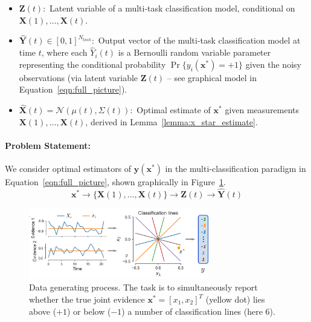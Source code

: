 \documentclass[12pt]{article}
\begin{document}
\begin{itemize}
    \item $\mathbf Z(t): $ Latent variable of a multi-task classification model, conditional on $\mathbf X(1), \dots, \mathbf X(t)$. 
    \item $\hat{\mathbf Y}(t) \in [0, 1]^{N_{task}}: $ Output vector of the multi-task classification model at time $t$, where each $\hat Y_i(t)$ is a Bernoulli random variable parameter representing the conditional probability $\Pr\{y_i(\mathbf x^*) = +1\}$ given the noisy observations (via latent variable $\mathbf Z(t)$ -- see graphical model in Equation~\ref{eqn:full_picture}). 
    \item $\hat{\mathbf X}(t) = \mathcal N(\mu(t), \Sigma(t)): $ Optimal estimate of $\mathbf x^*$ given measurements $\mathbf X(1), \dots, \mathbf X(t)$, derived in Lemma~\ref{lemma:x_star_estimate}. 
\end{itemize}

\paragraph{Problem Statement: } We consider optimal estimators of $\mathbf y(\mathbf x^*)$ in the multi-classification paradigm in Equation~\ref{eqn:full_picture}, shown graphically in Figure~\ref{fig:2a}. 
\begin{equation}
    \label{eqn:full_picture}
    \mathbf x^* 
    \to \{\mathbf X(1), \dots, \mathbf X(t)\} 
    \to \mathbf Z(t) 
    \to \hat{\mathbf Y}(t)
\end{equation}





\begin{figure}[h! tbp]
	\centering 
	\includegraphics[width=0.7\textwidth]{media/data_gen.png}
	\caption{Data generating process. The task is to simultaneously report whether the true joint evidence $\mathbf x^* = [x_1,x_2]^T$ (yellow dot) lies above ($+1$) or below ($-1$) a number of classification lines (here 6).}
	\label{fig:2a}
\end{figure}
\end{document}
